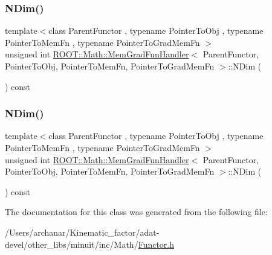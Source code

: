 \subsubsection{\texorpdfstring{NDim()}{NDim()}\hspace{0.1cm}{\footnotesize\ttfamily [2/3]}}
{\footnotesize\ttfamily template$<$class Parent\+Functor , typename Pointer\+To\+Obj , typename Pointer\+To\+Mem\+Fn , typename Pointer\+To\+Grad\+Mem\+Fn $>$ \\
unsigned int \mbox{\hyperlink{classROOT_1_1Math_1_1MemGradFunHandler}{R\+O\+O\+T\+::\+Math\+::\+Mem\+Grad\+Fun\+Handler}}$<$ Parent\+Functor, Pointer\+To\+Obj, Pointer\+To\+Mem\+Fn, Pointer\+To\+Grad\+Mem\+Fn $>$\+::N\+Dim (\begin{DoxyParamCaption}{ }\end{DoxyParamCaption}) const\hspace{0.3cm}{\ttfamily [inline]}}

\mbox{\label{classROOT_1_1Math_1_1MemGradFunHandler_acdd729dc718e1ecf3bac32af990904b4}} 
\subsubsection{\texorpdfstring{NDim()}{NDim()}\hspace{0.1cm}{\footnotesize\ttfamily [3/3]}}
{\footnotesize\ttfamily template$<$class Parent\+Functor , typename Pointer\+To\+Obj , typename Pointer\+To\+Mem\+Fn , typename Pointer\+To\+Grad\+Mem\+Fn $>$ \\
unsigned int \mbox{\hyperlink{classROOT_1_1Math_1_1MemGradFunHandler}{R\+O\+O\+T\+::\+Math\+::\+Mem\+Grad\+Fun\+Handler}}$<$ Parent\+Functor, Pointer\+To\+Obj, Pointer\+To\+Mem\+Fn, Pointer\+To\+Grad\+Mem\+Fn $>$\+::N\+Dim (\begin{DoxyParamCaption}{ }\end{DoxyParamCaption}) const\hspace{0.3cm}{\ttfamily [inline]}}



The documentation for this class was generated from the following file\+:\begin{DoxyCompactItemize}
\item 
/\+Users/archanar/\+Kinematic\+\_\+factor/adat-\/devel/other\+\_\+libs/minuit/inc/\+Math/\mbox{\hyperlink{adat-devel_2other__libs_2minuit_2inc_2Math_2Functor_8h}{Functor.\+h}}\end{DoxyCompactItemize}
